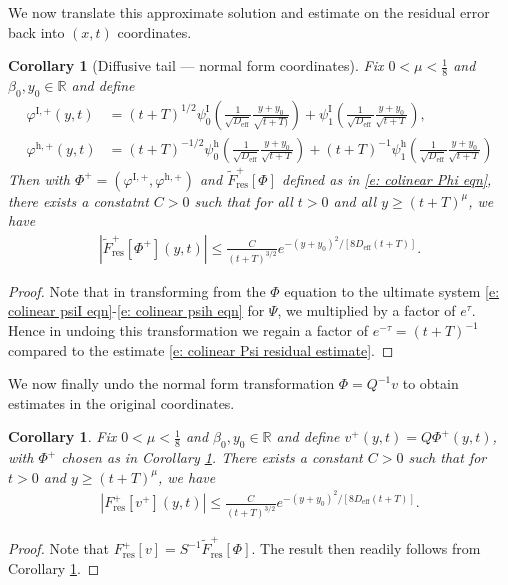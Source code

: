 \documentclass[11pt]{article}
\newcommand{\R}{\mathbb{R}}
\renewcommand{\phi}{\varphi}
\newtheorem{corollary}[prop]{Corollary}
\numberwithin{equation}{section}
\numberwithin{prop}{section}
\newcommand{\psih}{\psi^\mathrm{h}}
\newcommand{\Deff}{D_\mathrm{eff}}
\newcommand{\phihp}{\phi^\mathrm{h, +}}
\newcommand{\phiIp}{\phi^{\mathrm{I},+}}
\newcommand{\psiI}{\psi^\mathrm{I}}
\begin{document}
We now translate this approximate solution and estimate on the residual error back into $(x,t)$ coordinates. 

\begin{corollary}[Diffusive tail --- normal form coordinates] \label{c: colinear normal form residual}
	Fix $0 < \mu < \frac{1}{8}$ and $\beta_0, y_0 \in \R$ and define 
	\begin{align}
	\phiIp(y,t) &= (t+T)^{1/2} \psiI_0 \left( \frac{1}{\sqrt{\Deff}} \frac{y+y_0}{\sqrt{t+T)}} \right) + \psiI_1 \left( \frac{1}{\sqrt{\Deff}} \frac{y+y_0}{\sqrt{t+T}} \right), \\
	\phihp(y,t) &= (t+T)^{-1/2} \psih_0  \left( \frac{1}{\sqrt{\Deff}} \frac{y+y_0}{\sqrt{t+T}} \right) + (t+T)^{-1} \psih_1  \left( \frac{1}{\sqrt{\Deff}} \frac{y+y_0}{\sqrt{t+T}} \right)
	\end{align}
	Then with $\Phi^+ = (\phiIp, \phihp)$ and $\tilde{F}^+_\mathrm{res} [\Phi]$ defined as in \eqref{e: colinear Phi eqn}, there exists a constatnt $C > 0$ such that for all $t > 0$ and all $y \geq (t+T)^\mu$, we have 
	\begin{align}
	| \tilde{F}^+_\mathrm{res} [\Phi^+] (y,t) | \leq \frac{C}{(t+T)^{3/2}} e^{-(y+y_0)^2/[8 \Deff (t+T)]}. 
	\end{align}
\end{corollary}
\begin{proof}
	Note that in transforming from the $\Phi$ equation to the ultimate system \eqref{e: colinear psiI eqn}-\eqref{e: colinear psih eqn} for $\Psi$, we multiplied by a factor of $e^\tau$. Hence in undoing this transformation we regain a factor of $e^{-\tau} = (t+T)^{-1}$ compared to the estimate \eqref{e: colinear Psi residual estimate}. 
\end{proof}

We now finally undo the normal form transformation $\Phi = Q^{-1} v$ to obtain estimates in the original coordinates. 
\begin{corollary}\label{c: colinear vplus residual}
	Fix $0 < \mu < \frac{1}{8}$ and $\beta_0, y_0 \in \R$ and define $v^+(y,t) = Q \Phi^+(y,t)$, with $\Phi^+$ chosen as in Corollary \ref{c: colinear normal form residual}. There exists a constant $C > 0$ such that for $t > 0$ and $y \geq (t+T)^{\mu}$, we have 
	\begin{align}
	|F^+_\mathrm{res}[v^+] (y,t)| \leq \frac{C}{(t+T)^{3/2}} e^{-(y+y_0)^2/[8\Deff (t+T)]}.
	\end{align}
\end{corollary}
\begin{proof}
	Note that $F_\mathrm{res}^+ [v] = S^{-1} \tilde{F}_\mathrm{res}^+ [\Phi]$. The result then readily follows from Corollary \ref{c: colinear normal form residual}. 
\end{proof}
\end{document}
